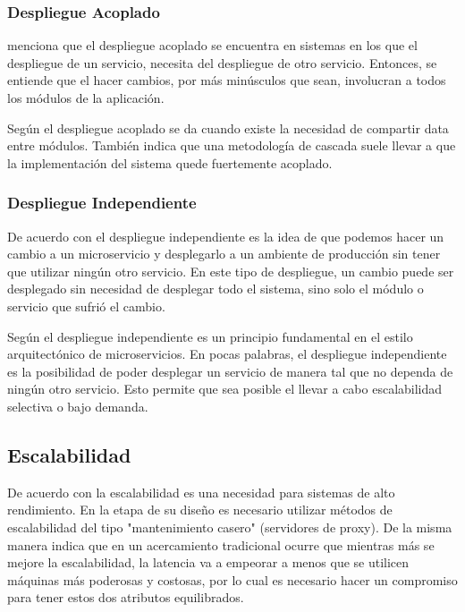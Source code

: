 \subsubsection{Despliegue Acoplado}

\cite{newman2019monolith} menciona que el despliegue acoplado se encuentra en sistemas en los que el
despliegue de un servicio, necesita del despliegue de otro servicio.
Entonces, se entiende que el hacer cambios, por más minúsculos que sean, involucran a todos los módulos
de la aplicación.

Según \cite{nadareishvili2016microservice} el despliegue acoplado se da cuando existe la necesidad
de compartir data entre módulos.
También indica que una metodología de cascada suele llevar a que la implementación del sistema
quede fuertemente acoplado.


\subsubsection{Despliegue Independiente}

De acuerdo con \cite{newman2019monolith} el despliegue independiente es la idea de que podemos
hacer un cambio a un microservicio y desplegarlo a un ambiente de producción sin tener que utilizar
ningún otro servicio.
En este tipo de despliegue, un cambio puede ser desplegado sin necesidad de desplegar todo el sistema,
sino solo el módulo o servicio que sufrió el cambio.

Según \cite{nadareishvili2016microservice} el despliegue independiente es un principio fundamental
en el estilo arquitectónico de microservicios.
En pocas palabras, el despliegue independiente es la posibilidad de poder desplegar un 
servicio de manera tal que no dependa de ningún otro servicio.
Esto permite que sea posible el llevar a cabo escalabilidad selectiva o bajo demanda.


\subsection{Escalabilidad}

De acuerdo con \cite{rodger2017tao} la escalabilidad es una necesidad para sistemas de alto rendimiento.
En la etapa de su diseño es necesario utilizar métodos de escalabilidad del tipo "mantenimiento casero"
(servidores de proxy).
De la misma manera indica que en un acercamiento tradicional ocurre que mientras más se mejore la 
escalabilidad, la latencia va a empeorar a menos que se utilicen máquinas más poderosas y costosas,
por lo cual es necesario hacer un compromiso para tener estos dos atributos equilibrados.

